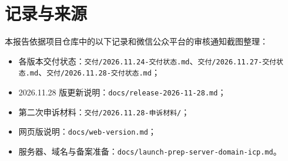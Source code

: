 \documentclass[11pt,a4paper,plain,CN,colored-proof=false,
  load-custom-latin-font-file=pku-font-latin.tex,
  load-custom-math-font-file=pku-font-math.tex,
  load-custom-cjk-font-file=pku-font-cjk.tex]{einfart}
\begin{document}
\section{记录与来源}

本报告依据项目仓库中的以下记录和微信公众平台的审核通知截图整理：
\begin{itemize}
  \item 各版本交付状态：\texttt{交付/2026.11.24-交付状态.md}、\texttt{交付/2026.11.27-交付状态.md}、\texttt{交付/2026.11.28-交付状态.md}；
  \item 2026.11.28 版更新说明：\texttt{docs/release-2026-11-28.md}；
  \item 第二次申诉材料：\texttt{交付/2026.11.28-申诉材料/}；
  \item 网页版说明：\texttt{docs/web-version.md}；
  \item 服务器、域名与备案准备：\texttt{docs/launch-prep-server-domain-icp.md}。
\end{itemize}
\end{document}
